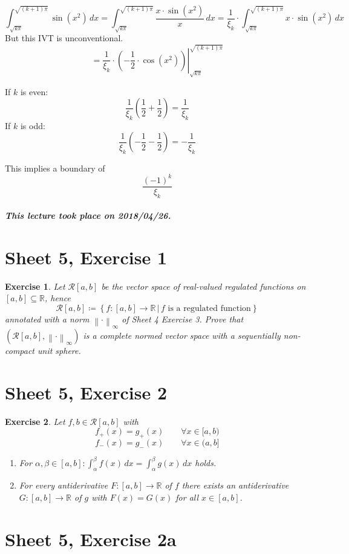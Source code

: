 \documentclass{article}
\newtheorem{ex}{Exercise} %
\newcommand{\setdef}[2]{\left\{\left.#1\,\right|\,#2\right\}}
\newcommand{\norm}[1]{\left\|#1\right\|}
\newcommand{\dateref}[1]{\paragraph{\textit{This lecture took place on #1.}}}
\begin{document}
\[
  \int_{\sqrt{k\pi}}^{\sqrt{(k+1)\pi}} \sin(x^2) \, dx
  = \int_{\sqrt{k\pi}}^{\sqrt{(k+1) \pi}} \frac{x \cdot \sin(x^2)}{x} \, dx
  = \frac{1}{\xi_k} \cdot \int_{\sqrt{k\pi}}^{\sqrt{(k+1)\pi}} x \cdot \sin(x^2) \, dx
\]
But this IVT is unconventional.
\[
  = \left. \frac{1}{\xi_k} \cdot \left(-\frac12 \cdot \cos(x^2)\right) \right|_{\sqrt{k\pi}}^{\sqrt{(k+1)\pi}}
\]

If $k$ is even:
\[ \frac{1}{\xi_k} \left(\frac12 + \frac12\right) = \frac{1}{\xi_k} \]
If $k$ is odd:
\[ \frac{1}{\xi_k} \left(-\frac12 - \frac12\right) = -\frac{1}{\xi_k} \]

This implies a boundary of
\[ \frac{(-1)^k}{\xi_k} \]

\dateref{2018/04/26}

\section{Sheet 5, Exercise 1}
\begin{ex}
  Let $\mathcal R[a,b]$ be the vector space of real-valued regulated functions on $[a,b] \subseteq \mathbb R$, hence
  \[ \mathcal R[a,b] \coloneqq \setdef{f: [a,b] \to \mathbb R}{f \text{ is a regulated function}} \]
  annotated with a norm $\norm{\cdot}_\infty$ of Sheet 4 Exercise 3.
  Prove that $(\mathcal R[a,b], \norm{\cdot}_\infty)$
  is a complete normed vector space with a sequentially non-compact unit sphere.
\end{ex}

\section{Sheet 5, Exercise 2}
\begin{ex}
  Let $f, b \in \mathcal R[a,b]$ with
  \[ f_+(x) = g_+(x) \qquad \forall x \in [a,b) \]
  \[ f_-(x) = g_-(x) \qquad \forall x \in (a,b] \]
  \begin{enumerate}
    \item For $\alpha,\beta \in [a,b]: \int_\alpha^\beta f(x) \, dx = \int_\alpha^\beta g(x) \, dx$ holds.
    \item For every antiderivative $F: [a,b] \to \mathbb R$ of $f$ there exists an antiderivative $G: [a,b] \to \mathbb R$ of $g$ with $F(x) = G(x)$ for all $x \in [a,b]$.
  \end{enumerate}
\end{ex}

\section{Sheet 5, Exercise 2a}
\end{document}
